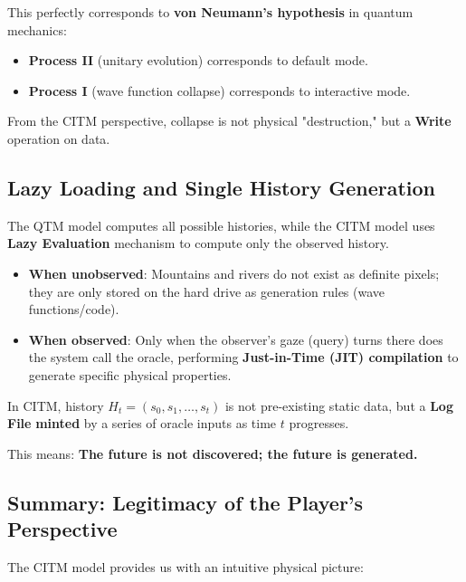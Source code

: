 This perfectly corresponds to \textbf{von Neumann's hypothesis} in quantum mechanics:

\begin{itemize}
\item \textbf{Process II} (unitary evolution) corresponds to default mode.

\item \textbf{Process I} (wave function collapse) corresponds to interactive mode.
\end{itemize}

From the CITM perspective, collapse is not physical "destruction," but a \textbf{Write} operation on data.

\subsection{Lazy Loading and Single History Generation}

The QTM model computes all possible histories, while the CITM model uses \textbf{Lazy Evaluation} mechanism to compute only the observed history.

\begin{itemize}
\item \textbf{When unobserved}: Mountains and rivers do not exist as definite pixels; they are only stored on the hard drive as generation rules (wave functions/code).

\item \textbf{When observed}: Only when the observer's gaze (query) turns there does the system call the oracle, performing \textbf{Just-in-Time (JIT) compilation} to generate specific physical properties.
\end{itemize}

\begin{definition}
In CITM, history $H_t = (s_0, s_1, \dots, s_t)$ is not pre-existing static data, but a \textbf{Log File} \textbf{minted} by a series of oracle inputs as time $t$ progresses.
\end{definition}

This means: \textbf{The future is not discovered; the future is generated.}

\subsection{Summary: Legitimacy of the Player's Perspective}

The CITM model provides us with an intuitive physical picture:

